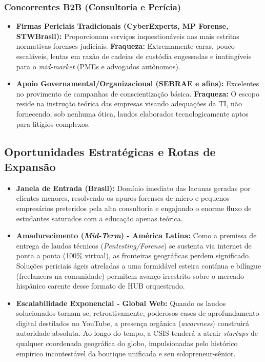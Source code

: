 \documentclass[../main.tex]{subfiles}
\begin{document}
\subsubsection{Concorrentes B2B (Consultoria e Perícia)}
\begin{itemize}
    \item \textbf{Firmas Periciais Tradicionais (CyberExperts, MP Forense, STWBrasil):} Proporcionam serviços inquestionáveis nas mais estritas normativas forenses judiciais. \textbf{Fraqueza:} Extremamente caras, pouco escaláveis, lentas em razão de cadeias de custódia engessadas e inatingíveis para o \textit{mid-market} (PMEs e advogados autônomos).
    \item \textbf{Apoio Governamental/Organizacional (SEBRAE e afins):} Excelentes no provimento de campanhas de conscientização básica. \textbf{Fraqueza:} O escopo reside na instrução teórica das empresas visando adequações da TI, não fornecendo, sob nenhuma ótica, laudos elaborados tecnologicamente aptos para litígios complexos.
\end{itemize}

\subsection{Oportunidades Estratégicas e Rotas de Expansão}

\begin{itemize}
    \item \textbf{Janela de Entrada (Brasil):} Domínio imediato das lacunas geradas por clientes menores, resolvendo os apuros forenses de micro e pequenos empresários preteridos pela alta consultoria e engajando o enorme fluxo de estudantes saturados com a educação apenas teórica.
    \item \textbf{Amadurecimento (\textit{Mid-Term}) - América Latina:} Como a premissa de entrega de laudos técnicos (\textit{Pentesting/Forense}) se sustenta via internet de ponta a ponta (100\% virtual), as fronteiras geográficas perdem significado. Soluções periciais ágeis atreladas a uma formidável esteira contínua e bilíngue (freelancers na comunidade) permitem avanço irrestrito sobre o mercado hispânico carente desse formato de HUB orquestrado.
    \item \textbf{Escalabilidade Exponencial - Global Web:} Quando os laudos solucionados tornam-se, retroativamente, poderosos cases de aprofundamento digital destilados no YouTube, a presença orgânica (\textit{awareness}) construirá autoridade absoluta. Ao longo do tempo, a CSIS tenderá a atrair \textit{startups} de qualquer coordenada geográfica do globo, impulsionadas pelo histórico empírico incontestável da boutique unificada e seu solopreneur-sênior.
\end{itemize}
\end{document}
